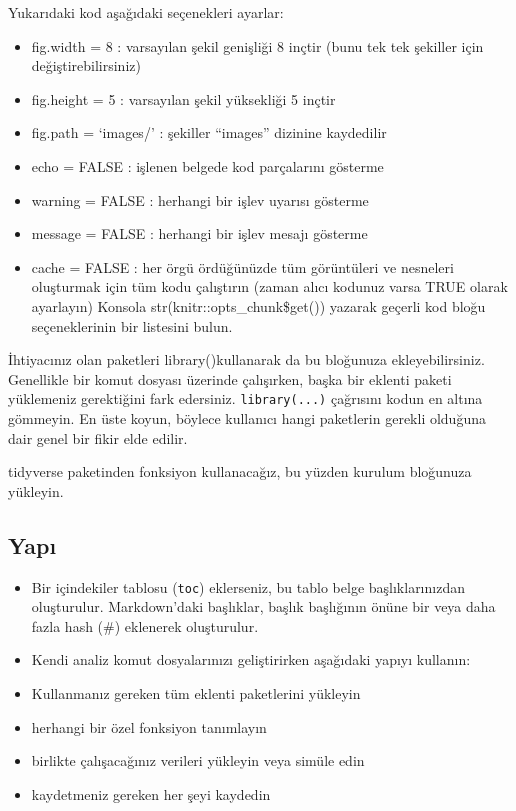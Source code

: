 \documentclass[
  oneside]{book}
\begin{document}
Yukarıdaki kod aşağıdaki seçenekleri ayarlar:

\begin{itemize}
\item
  fig.width = 8 : varsayılan şekil genişliği 8 inçtir (bunu tek tek şekiller için değiştirebilirsiniz)
\item
  fig.height = 5 : varsayılan şekil yüksekliği 5 inçtir
\item
  fig.path = `images/' : şekiller ``images'' dizinine kaydedilir
\item
  echo = FALSE : işlenen belgede kod parçalarını gösterme
\item
  warning = FALSE : herhangi bir işlev uyarısı gösterme
\item
  message = FALSE : herhangi bir işlev mesajı gösterme
\item
  cache = FALSE : her örgü ördüğünüzde tüm görüntüleri ve nesneleri oluşturmak için tüm kodu çalıştırın (zaman alıcı kodunuz varsa TRUE olarak ayarlayın) Konsola {{str}{(}{knitr}{::}{opts\_chunk}{\$}{get}{(}{)}{)}} yazarak geçerli kod bloğu seçeneklerinin bir listesini bulun.
\end{itemize}

İhtiyacınız olan paketleri {{library}{(}{)}}kullanarak da bu bloğunuza ekleyebilirsiniz. Genellikle bir komut dosyası üzerinde çalışırken, başka bir eklenti paketi yüklemeniz gerektiğini fark edersiniz. \texttt{library(...)} çağrısını kodun en altına gömmeyin. En üste koyun, böylece kullanıcı hangi paketlerin gerekli olduğuna dair genel bir fikir elde edilir.

\begin{try}
tidyverse paketinden fonksiyon kullanacağız, bu yüzden kurulum bloğunuza yükleyin.

\end{try}

\hypertarget{yapux131}{%
\subsection{Yapı}\label{yapux131}}

\begin{itemize}
\item
  Bir içindekiler tablosu (\texttt{toc}) eklerseniz, bu tablo belge başlıklarınızdan oluşturulur. Markdown'daki başlıklar, başlık başlığının önüne bir veya daha fazla hash (\#) eklenerek oluşturulur.
\item
  Kendi analiz komut dosyalarınızı geliştirirken aşağıdaki yapıyı kullanın:
\item
  Kullanmanız gereken tüm eklenti paketlerini yükleyin
\item
  herhangi bir özel fonksiyon tanımlayın
\item
  birlikte çalışacağınız verileri yükleyin veya simüle edin
\item
  kaydetmeniz gereken her şeyi kaydedin
\end{itemize}
\end{document}
